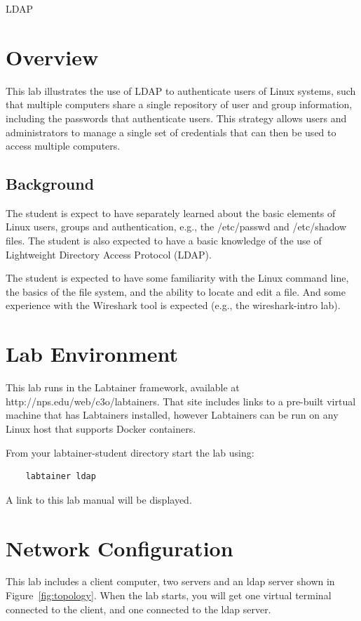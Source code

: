 


\begin{center}
{\LARGE LDAP}
\vspace{0.1in}\\
\end{center}

\copyrightnotice

\section{Overview}
This lab illustrates the use of LDAP to authenticate users of Linux systems,
such that multiple computers share a single repository of user and group information, including
the passwords that authenticate users.  This strategy allows users and administrators
to manage a single set of credentials that can then be used to access multiple computers. 

\subsection {Background}
The student is expect to have separately learned about the basic elements of Linux
users, groups and authentication, e.g., the /etc/passwd and /etc/shadow files.  
The student is also expected to have a basic knowledge of the use of Lightweight Directory
Access Protocol (LDAP).

The student is expected to have some familiarity with the Linux command line,
the basics of the file system, and the ability to locate and edit a file.  And some
experience with the Wireshark tool is expected (e.g., the wireshark-intro lab).

\section{Lab Environment}
This lab runs in the Labtainer framework,
available at http://nps.edu/web/c3o/labtainers.
That site includes links to a pre-built virtual machine
that has Labtainers installed, however Labtainers can
be run on any Linux host that supports Docker containers.

From your labtainer-student directory start the lab using:
\begin{verbatim}
    labtainer ldap
\end{verbatim}
\noindent A link to this lab manual will be displayed.  


\section{Network Configuration}
This lab includes a client computer, two servers and
an ldap server shown in Figure~\ref{fig:topology}.
When the lab starts, you will get one virtual terminal connected 
to the client, and one connected to the ldap server.

